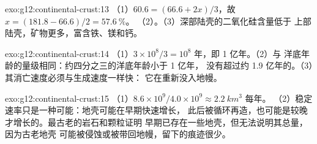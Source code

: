\begin{solution}{exo:g12:continental-crust:13}
（1）$60.6 = (66.6 + 2x)/3$，故 $x = (181.8 - 66.6)/2 = \qty{57.6}{\percent}$。
（2）。（3）深部陆壳的二氧化硅含量低于
上部陆壳，矿物更多，富含铁、镁和钙。
\end{solution}

\begin{solution}{exo:g12:continental-crust:14}
（1）$3 \times 10^8/3 = 10^8$ 年，即 1 亿年。（2）与
洋底年龄的量级相同：约四分之三的洋底年龄小于 1 亿年，
没有超过约 1.9 亿年的。（3）其消亡速度必须与生成速度一样快：
它在重新没入地幔。
\end{solution}

\begin{solution}{exo:g12:continental-crust:15}
（1）$8.6 \times 10^9 / 4.0 \times 10^9 \approx \qty{2.2}{km^3}$ 每年。
（2）稳定速率只是一种可能：地壳可能在早期快速增长，
此后被循环再造，也可能是较晚才增长的。最古老的岩石和颗粒证明
早期已存在一些地壳，但无法说明其总量，因为古老地壳
可能被侵蚀或被带回地幔，留下的痕迹很少。
\end{solution}

